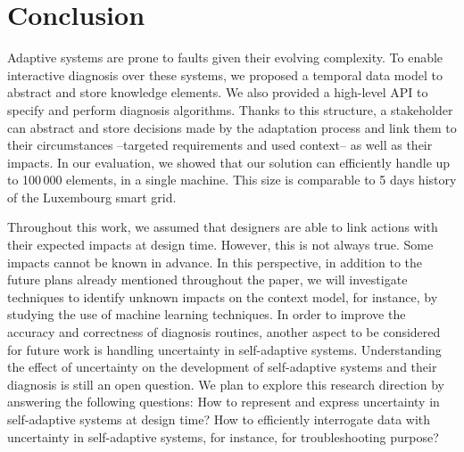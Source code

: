 \section{Conclusion}
\label{sec:tkm:conclusion}

Adaptive systems are prone to faults  given their evolving complexity.
To enable interactive diagnosis over these systems, we proposed a temporal data model to abstract and store knowledge elements. We also provided a high-level API to specify and perform diagnosis algorithms.
Thanks to this structure, a stakeholder can abstract and store decisions made by the adaptation process and link them to their circumstances --targeted requirements and used context-- as well as their impacts.
In our evaluation, we showed that our solution can efficiently handle up to 100\,000 elements, in a single machine.
This size is comparable to 5 days history of the Luxembourg smart grid.


Throughout this work, we assumed that designers are able to link actions with their expected impacts at design time. However, this is not always true. Some impacts  cannot be known in advance.
In this perspective, in addition to the future plans already mentioned throughout the paper, we will investigate techniques to identify unknown impacts on the context model, for instance, by studying the use of machine learning  techniques.
In order to improve the accuracy and correctness of diagnosis routines, another aspect to be considered for future work is handling uncertainty in self-adaptive systems.
Understanding the effect of uncertainty on the development of self-adaptive systems and their diagnosis is still an open question.
We plan to explore this research direction by answering the following questions: How to represent and express uncertainty in self-adaptive systems at design time?
How to efficiently interrogate data with uncertainty in self-adaptive systems,  for instance, for troubleshooting purpose?